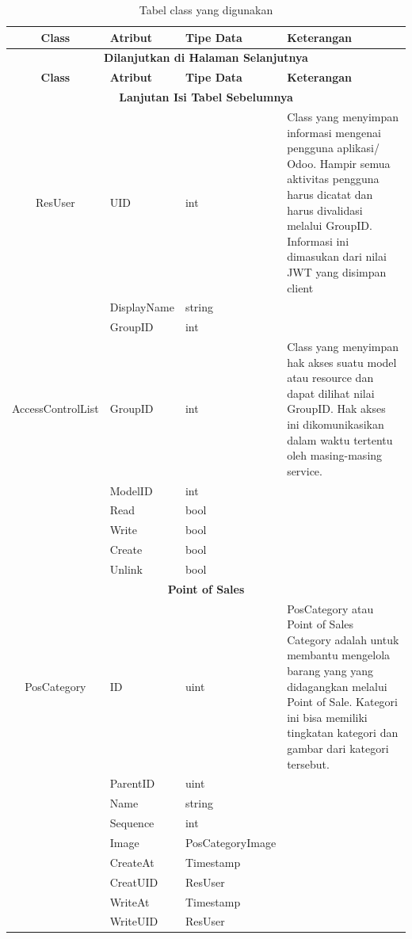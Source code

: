 \begin{longtable}{|c|p{3cm}|p{3cm}|p{4cm}|}
	\caption{Tabel class yang digunakan}
	\label{tab:daftar-class}\\
	\hline
	\textbf{Class} & \textbf{Atribut} & \textbf{Tipe Data} & \textbf{Keterangan} \\
	\hline
	\endfirsthead
	\hline
	\multicolumn{4}{|c|}{\textbf{Dilanjutkan di Halaman Selanjutnya}} \\
	\hline
	\textbf{Class} & \textbf{Atribut} & \textbf{Tipe Data} & \textbf{Keterangan} \\
	\hline
	\endhead
	\hline
	\multicolumn{4}{|c|}{\textbf{Lanjutan Isi Tabel Sebelumnya}} \\
	\hline
	\endfoot
	\hline
	\endlastfoot
	ResUser & UID & int & Class yang menyimpan informasi mengenai pengguna aplikasi/ Odoo. Hampir semua aktivitas pengguna harus dicatat dan harus divalidasi melalui GroupID. Informasi ini dimasukan dari nilai JWT yang disimpan client \\
	\cline{2-3}
	& DisplayName & string & \\
	\cline{2-3}
	& GroupID & int & \\
	\hline
	AccessControlList & GroupID & int & Class yang menyimpan hak akses suatu model atau resource dan dapat dilihat nilai GroupID. Hak akses ini dikomunikasikan dalam waktu tertentu oleh masing-masing service.  \\
	\cline{2-3}
	& ModelID & int & \\
	\cline{2-3}
	& Read & bool & \\
	\cline{2-3}
	& Write & bool & \\
	\cline{2-3}
	& Create & bool & \\
	\cline{2-3}
	& Unlink & bool & \\
	\hline

	\multicolumn{4}{|c|}{\textbf{Point of Sales}} \\
	\hline
	PosCategory & ID & uint & PosCategory atau Point of Sales Category adalah untuk membantu mengelola barang yang yang didagangkan melalui Point of Sale. Kategori ini bisa memiliki tingkatan kategori dan gambar dari kategori tersebut. \\
	\cline{2-3}
	& ParentID & uint & \\
	\cline{2-3}
	& Name & string & \\
	\cline{2-3}
	& Sequence & int & \\
	\cline{2-3}
	& Image &  PosCategoryImage & \\
	\cline{2-3}
	& CreateAt & Timestamp & \\
	\cline{2-3}
	& CreatUID & ResUser & \\
	\cline{2-3}
	& WriteAt & Timestamp & \\
	\cline{2-3}
	& WriteUID & ResUser & \\


\end{longtable}
